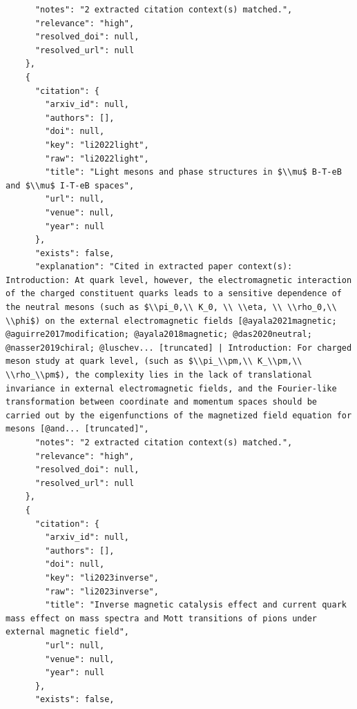 \documentclass[11pt]{article}
\begin{document}
\begin{verbatim}
      "notes": "2 extracted citation context(s) matched.",
      "relevance": "high",
      "resolved_doi": null,
      "resolved_url": null
    },
    {
      "citation": {
        "arxiv_id": null,
        "authors": [],
        "doi": null,
        "key": "li2022light",
        "raw": "li2022light",
        "title": "Light mesons and phase structures in $\\mu$ B-T-eB and $\\mu$ I-T-eB spaces",
        "url": null,
        "venue": null,
        "year": null
      },
      "exists": false,
      "explanation": "Cited in extracted paper context(s): Introduction: At quark level, however, the electromagnetic interaction of the charged constituent quarks leads to a sensitive dependence of the neutral mesons (such as $\\pi_0,\\ K_0, \\ \\eta, \\ \\rho_0,\\ \\phi$) on the external electromagnetic fields [@ayala2021magnetic; @aguirre2017modification; @ayala2018magnetic; @das2020neutral; @nasser2019chiral; @luschev... [truncated] | Introduction: For charged meson study at quark level, (such as $\\pi_\\pm,\\ K_\\pm,\\ \\rho_\\pm$), the complexity lies in the lack of translational invariance in external electromagnetic fields, and the Fourier-like transformation between coordinate and momentum spaces should be carried out by the eigenfunctions of the magnetized field equation for mesons [@and... [truncated]",
      "notes": "2 extracted citation context(s) matched.",
      "relevance": "high",
      "resolved_doi": null,
      "resolved_url": null
    },
    {
      "citation": {
        "arxiv_id": null,
        "authors": [],
        "doi": null,
        "key": "li2023inverse",
        "raw": "li2023inverse",
        "title": "Inverse magnetic catalysis effect and current quark mass effect on mass spectra and Mott transitions of pions under external magnetic field",
        "url": null,
        "venue": null,
        "year": null
      },
      "exists": false,

\end{verbatim}
\end{document}
